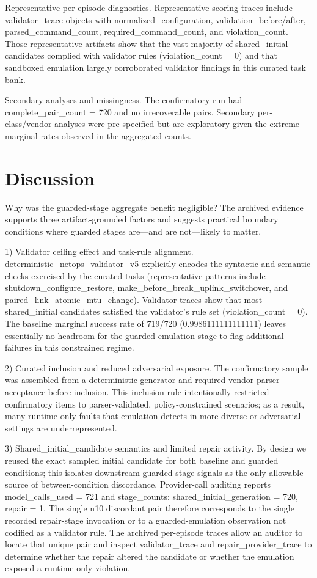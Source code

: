 \documentclass[conference]{IEEEtran}
\begin{document}
Representative per-episode diagnostics. Representative scoring traces include validator\_trace objects with normalized\_configuration, validation\_before/after, parsed\_command\_count, required\_command\_count, and violation\_count. Those representative artifacts show that the vast majority of shared\_initial candidates complied with validator rules (violation\_count = 0) and that sandboxed emulation largely corroborated validator findings in this curated task bank.

Secondary analyses and missingness. The confirmatory run had complete\_pair\_count = 720 and no irrecoverable pairs. Secondary per-class/vendor analyses were pre-specified but are exploratory given the extreme marginal rates observed in the aggregated counts.

\section{Discussion}
Why was the guarded-stage aggregate benefit negligible? The archived evidence supports three artifact-grounded factors and suggests practical boundary conditions where guarded stages are---and are not---likely to matter.

1) Validator ceiling effect and task-rule alignment. deterministic\_netops\_validator\_v5 explicitly encodes the syntactic and semantic checks exercised by the curated tasks (representative patterns include shutdown\_configure\_restore, make\_before\_break\_uplink\_switchover, and paired\_link\_atomic\_mtu\_change). Validator traces show that most shared\_initial candidates satisfied the validator's rule set (violation\_count = 0). The baseline marginal success rate of 719/720 (0.9986111111111111) leaves essentially no headroom for the guarded emulation stage to flag additional failures in this constrained regime.

2) Curated inclusion and reduced adversarial exposure. The confirmatory sample was assembled from a deterministic generator and required vendor-parser acceptance before inclusion. This inclusion rule intentionally restricted confirmatory items to parser-validated, policy-constrained scenarios; as a result, many runtime-only faults that emulation detects in more diverse or adversarial settings are underrepresented.

3) Shared\_initial\_candidate semantics and limited repair activity. By design we reused the exact sampled initial candidate for both baseline and guarded conditions; this isolates downstream guarded-stage signals as the only allowable source of between-condition discordance. Provider-call auditing reports model\_calls\_used = 721 and stage\_counts: shared\_initial\_generation = 720, repair = 1. The single n10 discordant pair therefore corresponds to the single recorded repair-stage invocation or to a guarded-emulation observation not codified as a validator rule. The archived per-episode traces allow an auditor to locate that unique pair and inspect validator\_trace and repair\_provider\_trace to determine whether the repair altered the candidate or whether the emulation exposed a runtime-only violation.
\end{document}
